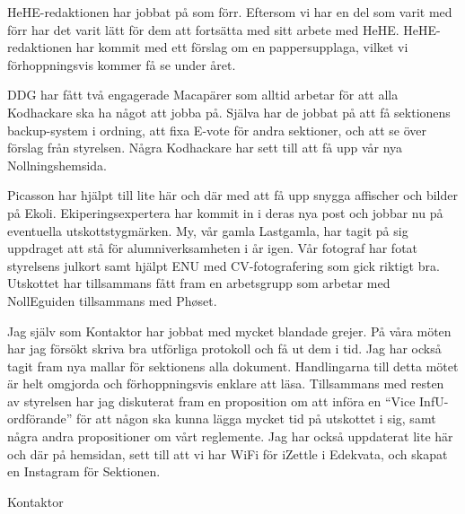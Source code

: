 \documentclass[../_main/handlingar.tex]{subfiles}
\begin{document}

HeHE-redaktionen har jobbat på som förr. Eftersom vi har en del som varit med förr har det varit lätt för dem att fortsätta med sitt arbete med HeHE. HeHE-redaktionen har kommit med ett förslag om en pappersupplaga, vilket vi förhoppningsvis kommer få se under året.

DDG har fått två engagerade Macapärer som alltid arbetar för att alla Kodhackare ska ha något att jobba på. Själva har de jobbat på att få sektionens backup-system i ordning, att fixa E-vote för andra sektioner, och att se över förslag från styrelsen. Några Kodhackare har sett till att få upp vår nya Nollningshemsida.

Picasson har hjälpt till lite här och där med att få upp snygga affischer och bilder på Ekoli. Ekiperingsexpertera har kommit in i deras nya post och jobbar nu på eventuella utskottstygmärken. My, vår gamla Lastgamla, har tagit på sig uppdraget att stå för alumniverksamheten i år igen. Vår fotograf har fotat styrelsens julkort samt hjälpt ENU med CV-fotografering som gick riktigt bra. Utskottet har tillsammans fått fram en arbetsgrupp som arbetar med NollEguiden tillsammans med Phøset.

Jag själv som Kontaktor har jobbat med mycket blandade grejer. På våra möten har jag försökt skriva bra utförliga protokoll och få ut dem i tid. Jag har också tagit fram nya mallar för sektionens alla dokument. Handlingarna till detta mötet är helt omgjorda och förhoppningsvis enklare att läsa. Tillsammans med resten av styrelsen har jag diskuterat fram en proposition om att införa en ``Vice InfU-ordförande'' för att någon ska kunna lägga mycket tid på utskottet i sig, samt några andra propositioner om vårt reglemente. Jag har också uppdaterat lite här och där på hemsidan, sett till att vi har WiFi för iZettle i Edekvata, och skapat en Instagram för Sektionen.

\begin{signatures}{1}
    \mvh
    \signature{Erik Månsson}{Kontaktor}
\end{signatures}
\end{document}
